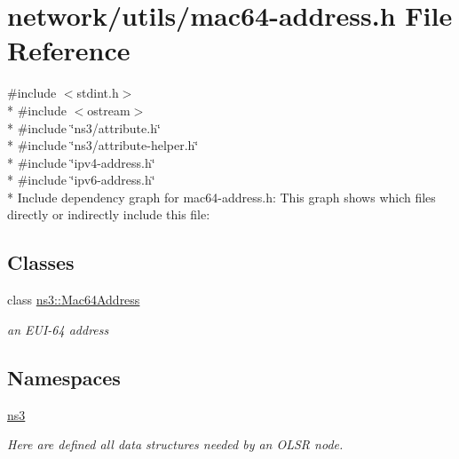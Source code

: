 \hypertarget{mac64-address_8h}{}\section{network/utils/mac64-\/address.h File Reference}
\label{mac64-address_8h}
{\ttfamily \#include $<$stdint.\+h$>$}\\*
{\ttfamily \#include $<$ostream$>$}\\*
{\ttfamily \#include \char`\"{}ns3/attribute.\+h\char`\"{}}\\*
{\ttfamily \#include \char`\"{}ns3/attribute-\/helper.\+h\char`\"{}}\\*
{\ttfamily \#include \char`\"{}ipv4-\/address.\+h\char`\"{}}\\*
{\ttfamily \#include \char`\"{}ipv6-\/address.\+h\char`\"{}}\\*
Include dependency graph for mac64-\/address.h\+:
This graph shows which files directly or indirectly include this file\+:
\subsection*{Classes}
\begin{DoxyCompactItemize}
\item 
class \hyperlink{classns3_1_1Mac64Address}{ns3\+::\+Mac64\+Address}
\begin{DoxyCompactList}\small\item\em an E\+U\+I-\/64 address \end{DoxyCompactList}\end{DoxyCompactItemize}
\subsection*{Namespaces}
\begin{DoxyCompactItemize}
\item 
 \hyperlink{namespacens3}{ns3}
\begin{DoxyCompactList}\small\item\em Here are defined all data structures needed by an O\+L\+SR node. \end{DoxyCompactList}\end{DoxyCompactItemize}
